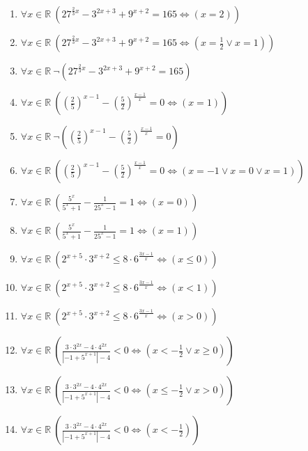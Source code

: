 \documentclass[11pt,a4paper]{article}
\begin{document}
\begin{enumerate}
\item $\displaystyle \forall x \in \mathbb{R}\ \left( 27^{\frac{2}{3}x} - 3^{2x+3} + 9^{x+2} = 165 \iff \left( x = 2 \right) \right)$
\item $\displaystyle \forall x \in \mathbb{R}\ \left( 27^{\frac{2}{3}x} - 3^{2x+3} + 9^{x+2} = 165 \iff \left( x = \frac{1}{2} \lor x = 1 \right) \right)$
\item $\displaystyle \forall x \in \mathbb{R}\ \lnot \left( 27^{\frac{2}{3}x} - 3^{2x+3} + 9^{x+2} = 165 \right)$
\item $\displaystyle \forall x \in \mathbb{R}\ \left( \left(\frac{2}{5}\right)^{x-1} - \left(\frac{5}{2}\right)^{\frac{x-1}{x}} = 0 \iff \left( x = 1 \right) \right)$
\item $\displaystyle \forall x \in \mathbb{R}\ \lnot \left( \left(\frac{2}{5}\right)^{x-1} - \left(\frac{5}{2}\right)^{\frac{x-1}{x}} = 0 \right)$
\item $\displaystyle \forall x \in \mathbb{R}\ \left( \left(\frac{2}{5}\right)^{x-1} - \left(\frac{5}{2}\right)^{\frac{x-1}{x}} = 0 \iff \left( x = -1 \lor x = 0 \lor x = 1 \right) \right)$
\item $\displaystyle \forall x \in \mathbb{R}\ \left( \frac{5^{x}}{5^{x} + 1} - \frac{1}{25^{x} - 1} = 1 \iff \left( x = 0 \right) \right)$
\item $\displaystyle \forall x \in \mathbb{R}\ \left( \frac{5^{x}}{5^{x} + 1} - \frac{1}{25^{x} - 1} = 1 \iff \left( x = 1 \right) \right)$
\item $\displaystyle \forall x \in \mathbb{R}\ \left( 2^{x+5} \cdot 3^{x+2} \le 8 \cdot 6^{\frac{3x-1}{x}} \iff \left( x \le 0 \right) \right)$
\item $\displaystyle \forall x \in \mathbb{R}\ \left( 2^{x+5} \cdot 3^{x+2} \le 8 \cdot 6^{\frac{3x-1}{x}} \iff \left( x < 1 \right) \right)$
\item $\displaystyle \forall x \in \mathbb{R}\ \left( 2^{x+5} \cdot 3^{x+2} \le 8 \cdot 6^{\frac{3x-1}{x}} \iff \left( x > 0 \right) \right)$
\item $\displaystyle \forall x \in \mathbb{R}\ \left( \frac{3 \cdot 3^{2x} - 4 \cdot 4^{2x}}{\left| -1 + 5^{x+1} \right| - 4} < 0 \iff \left( x < -\frac{1}{2} \lor x \ge 0 \right) \right)$
\item $\displaystyle \forall x \in \mathbb{R}\ \left( \frac{3 \cdot 3^{2x} - 4 \cdot 4^{2x}}{\left| -1 + 5^{x+1} \right| - 4} < 0 \iff \left( x \le -\frac{1}{2} \lor x > 0 \right) \right)$
\item $\displaystyle \forall x \in \mathbb{R}\ \left( \frac{3 \cdot 3^{2x} - 4 \cdot 4^{2x}}{\left| -1 + 5^{x+1} \right| - 4} < 0 \iff \left( x < -\frac{1}{2} \right) \right)$

\end{enumerate}
\end{document}
